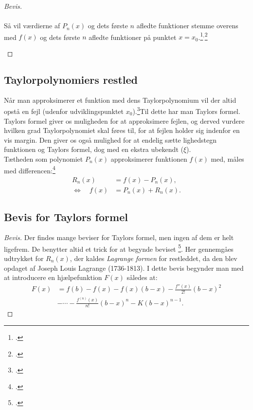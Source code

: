 \documentclass[12pt, a4paper]{article}
\begin{document}
\begin{refsection}
\begin{proof}[Bevis]
\begin{savenotes}
\begin{mdframed}
\begin{equation}
\begin{aligned}
    \end{aligned}
\end{equation}
\renewcommand{\thempfootnote}{\arabic{footnote}} 
Så vil værdierne af $P_n(x)$ og dets første $n$ afledte funktioner stemme overens med $f(x)$ og dets første $n$ afledte funktioner på punktet $x=x_0$.\footcite[s. 647-648]{calculuswithanalyticgeometry}$^,$\footcite[s.1-2]{alsholm2}%
\end{mdframed}
   \end{savenotes} 
\end{proof}
\subsection{Taylorpolynomiers restled}
Når man approksimerer et funktion med dens Taylorpolynomium vil der altid opstå en fejl (udenfor udviklingspunktet $x_0$).\footcite[s. 4]{alsholm1}Til dette har man Taylors formel.\\
Taylors formel giver os muligheden for at approksimere fejlen, og derved vurdere hvilken grad Taylorpolynomiet skal føres til, for at fejlen holder sig indenfor en vis margin. Den giver os også mulighed for at endelig sætte lighedstegn funktionen og Taylors formel, dog med en ekstra ubekendt ($\xi$).\\
Tætheden som polynomiet $P_n(x)$ approksimerer funktionen $f(x)$ med, måles med differencen:\footcite[s. 650]{calculuswithanalyticgeometry}
\begin{equation}\label{restled}
    \begin{aligned}
        R_n(x)&=f(x)-P_n(x),\\
        \Leftrightarrow \quad f(x)&=P_n(x)+R_n(x).
    \end{aligned}
\end{equation}
\subsection{Bevis for Taylors formel}

\begin{proof}[Bevis]Der findes mange beviser for Taylors formel, men ingen af dem er helt ligefrem. De benytter altid et trick for at begynde beviset \footcite[A-44]{calculuswithanalyticgeometry}. Her gennemgåes udtrykket for $R_n(x)$, der kaldes \textit{Lagrange formen} for restleddet, da den blev opdaget af Joseph Louis Lagrange (1736-1813). I dette bevis begynder man med at introducere en hjælpefunktion $F(x)$ således at:
\begin{equation}\label{bevisrest1}
 \begin{aligned}
     F(x)&=f(b)-f(x)-f(x)(b-x)-\frac{f''(x)}{2!}(b-x)^2\\
         &- \cdots -\frac{f^{(n)}(x)}{n!}(b-x)^n-K(b-x)^{n-1}.
\end{aligned}
\end{equation}


\end{proof}
\end{refsection}
\end{document}
